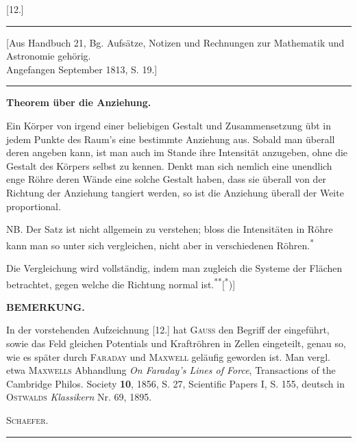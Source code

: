 \clearpage\begingroup{}
\begin{center}[12.]\end{center}
\noindent\rule{\textwidth}{.4pt}\par
\begin{center}\small [Aus Handbuch 21, Bg. Aufsätze, Notizen und Rechnungen zur Mathematik und Astronomie gehörig.\\
Angefangen September 1813, S. 19.]\end{center}
\noindent\rule{\textwidth}{.4pt}
\begin{center}\textbf{Theorem über die Anziehung.}\end{center}
\indent Ein Körper von irgend einer beliebigen Gestalt und Zusammensetzung
übt in jedem Punkte des Raum’s eine bestimmte Anziehung aus. Sobald
man überall deren  angeben kann, ist man auch im Stande ihre
Intensität anzugeben, ohne die Gestalt des Körpers selbst zu kennen. Denkt
man sich nemlich eine unendlich enge Röhre deren Wände eine solche Gestalt
haben, dass sie überall von der Richtung der Anziehung tangiert werden,
so ist die Anziehung überall der Weite proportional.

\raisebox{-.6ex}{*}NB. Der Satz ist nicht allgemein zu verstehen; bloss die Intensitäten
in  Röhre kann man so unter sich vergleichen, nicht aber in verschiedenen
Röhren.\textsuperscript{*}

\raisebox{-.6ex}{**}Die Vergleichung wird vollständig, indem man zugleich die Systeme
der Flächen betrachtet, gegen welche die Richtung normal ist.\textsuperscript{**}[\textsuperscript{*})]
\begingroup\renewcommand{\thefootnote}{}\endgroup
\bigskip\begin{center}\textbf{BEMERKUNG.}\end{center}
{\small\noindent\hspace*{\parindent}In der vorstehenden Aufzeichnung [12.] hat \textsc{Gauss} den Begriff der  eingeführt, sowie
das Feld  gleichen Potentials und Kraftröhren in Zellen eingeteilt, genau so, wie es
später durch \textsc{Faraday} und \textsc{Maxwell} geläufig geworden ist. Man vergl. etwa \textsc{Maxwells} Abhandlung
\textit{On Faraday’s Lines of Force}, Transactions of the Cambridge Philos. Society \textbf{10}, 1856, S. 27, Scientific
Papers I, S. 155, deutsch in \textsc{Ostwalds} \textit{Klassikern} Nr. 69, 1895.
\par\raggedleft\textsc{Schaefer}.\par}
\bigskip\begin{center}\rule{.23\textwidth}{.4pt}\end{center}
\clearpage\endgroup
